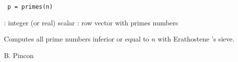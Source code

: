 
\begin{mandesc}
\end{mandesc}

\begin{calling_sequence}
\begin{verbatim}
 p = primes(n)
\end{verbatim}
\end{calling_sequence}

\begin{parameters}
  \begin{varlist}
    : integer (or real) scalar
    : row vector with primes numbers
  \end{varlist}
\end{parameters}

\begin{mandescription}
  Computes all prime numbers inferior or equal to $n$ with 
  Erathostene 's sieve.
\end{mandescription}

\begin{examples}
\begin{program}
\end{program}
\end{examples}



\begin{authors}
B. Pincon
\end{authors}

